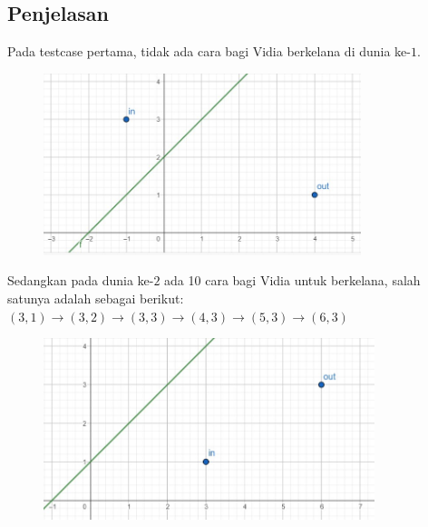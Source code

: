 \documentclass{article}
\begin{document}
\subsection*{Penjelasan}
Pada testcase pertama, tidak ada cara bagi Vidia berkelana di dunia ke-$1$.
\begin{figure}[h]
\includegraphics[height=200px]{ilustrasi-1.jpg}
\end{figure}

Sedangkan pada dunia ke-$2$ ada 10 cara bagi Vidia untuk berkelana, salah satunya adalah sebagai berikut: $(3, 1) \xrightarrow{} (3, 2) \xrightarrow{} (3, 3) \xrightarrow{} (4, 3) \xrightarrow{} (5, 3) \xrightarrow{} (6, 3)$ 

\begin{figure}[h]
\includegraphics[height=200px]{ilustrasi-2.jpg}
\end{figure}
\end{document}
